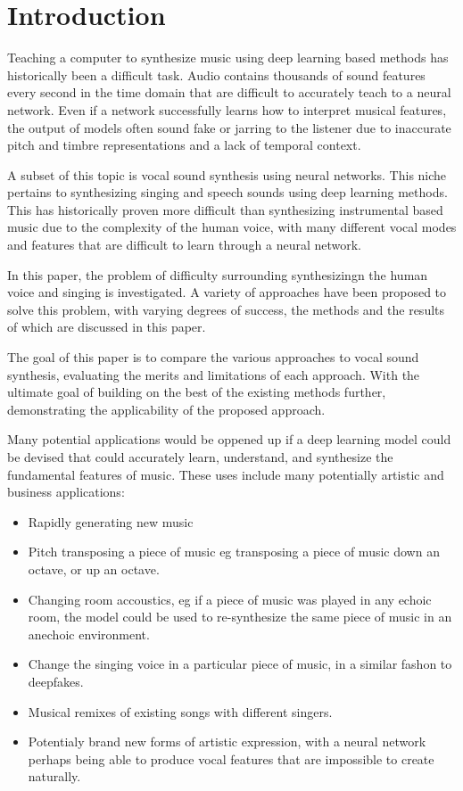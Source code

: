 \chapter{Introduction}

\noindent Teaching a computer to synthesize music using deep learning based methods has historically been a difficult task. Audio contains thousands of sound features every second in the time domain that are difficult to accurately teach to a neural network. Even if a network successfully learns how to interpret musical features, the output of models often sound fake or jarring to the listener due to inaccurate pitch and timbre representations and a lack of temporal context.

A subset of this topic is vocal sound synthesis using neural networks. This niche pertains to synthesizing singing and speech sounds using deep learning methods. This has historically proven more difficult than synthesizing instrumental based music due to the complexity of the human voice, with many different vocal modes and features that are difficult to learn through a neural network.

In this paper, the problem of difficulty surrounding synthesizingn the human voice and singing is investigated. A variety of approaches have been proposed to solve this problem, with varying degrees of success, the methods and the results of which are discussed in this paper.

The goal of this paper is to compare the various approaches to vocal sound synthesis, evaluating the merits and limitations of each approach. With the ultimate goal of building on the best of the existing methods further, demonstrating the applicability of the proposed approach.

Many potential applications would be oppened up if a deep learning model could be devised that could accurately learn, understand, and synthesize the fundamental features of music. These uses include many potentially artistic and business applications:

\begin{itemize}
    \item Rapidly generating new music
    \item Pitch transposing a piece of music eg transposing a piece of music down an octave, or up an octave.
    \item Changing room accoustics, eg if a piece of music was played in any echoic room, the model could be used to re-synthesize the same piece of music in an anechoic environment.
    \item Change the singing voice in a particular piece of music, in a similar fashon to deepfakes.
    \item Musical remixes of existing songs with different singers.
    \item Potentialy brand new forms of artistic expression, with a neural network perhaps being able to produce vocal features that are impossible to create naturally.
\end{itemize}

